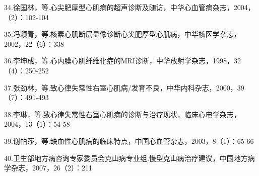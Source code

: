 34.徐国林，等.心尖肥厚型心肌病的超声诊断及随访，中华心血管病杂志，2004，（2）：102-104

35.冯颖青，等.核素心肌断层显像诊断心尖肥厚型心肌病，中华核医学杂志，2002，22（6）：338

36.李坤成，等.心内膜心肌纤维化症的MRI诊断，中华放射学杂志，1998，32（4）：250-252

37.张劲林，等.致心律失常性右室心肌病/发育不良，中华内科杂志，2000，39（7）：491-493

38.李琳，等.致心律失常性右室心肌病的诊断与治疗现状，临床心电学杂志，2004，13（1）：54-58

39.谢帕莎，等.缺血性心肌病的临床特点，中国心血管杂志，2003，8（1）：65-66

40.卫生部地方病咨询专家委员会克山病专业组.慢型克山病治疗建议，中国地方病学杂志，2007，26（2）：211

\protect\hypertarget{text00144.html}{}{}

